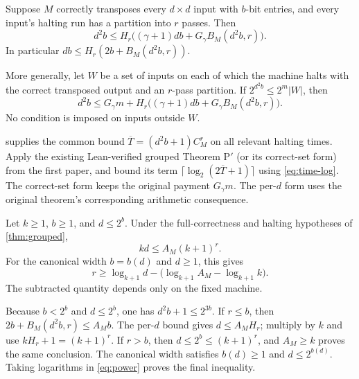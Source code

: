 \begin{theorem}\label{thm:grouped}
Suppose $M$ correctly transposes every $d\times d$ input with $b$-bit entries,
and every input's halting run has a partition into $r$ passes. Then
\begin{equation}\label{eq:grouped}
 d^2b\le H_r\bigl((\gamma+1)db+G_\gamma B_M(d^2b,r)\bigr).
\end{equation}
In particular $db\le H_r(2b+B_M(d^2b,r))$.

More generally, let $W$ be a set of inputs on each of which the machine
halts with the correct transposed output and an $r$-pass partition. If
$2^{d^2b}\le2^m|W|$, then
\begin{equation}\label{eq:grouped-on}
 d^2b\le G_\gamma m+
 H_r\bigl((\gamma+1)db+G_\gamma B_M(d^2b,r)\bigr).
\end{equation}
No condition is imposed on inputs outside $W$.
\end{theorem}
\begin{outline}
 supplies the common bound
$\overline T=(d^2b+1)C_M^r$ on all relevant halting times. Apply the existing
Lean-verified grouped Theorem P$'$ (or its correct-set form) from the first
paper, and bound its term $\lceil\log_2(2\overline T+1)\rceil$ using
\cref{eq:time-log}. The correct-set form keeps the original payment
$G_\gamma m$. The per-$d$ form uses the original theorem's corresponding
arithmetic consequence.
\end{outline}

\begin{theorem}\label{thm:passes}
Let $k\ge1$, $b\ge1$, and $d\le2^b$. Under the full-correctness and halting
hypotheses of \cref{thm:grouped},
\begin{equation}\label{eq:power}
 kd\le A_M(k+1)^r.
\end{equation}
For the canonical width $b=b(d)$ and $d\ge1$, this gives
\[
 r\ge\log_{k+1}d-
   \bigl(\log_{k+1}A_M-\log_{k+1}k\bigr).
\]
The subtracted quantity depends only on the fixed machine.
\end{theorem}
\begin{outline}
Because $b<2^b$ and $d\le2^b$, one has
$d^2b+1\le2^{3b}$. If $r\le b$, then
$2b+B_M(d^2b,r)\le A_M b$. The per-$d$ bound gives $d\le A_M H_r$;
multiply by $k$ and use $kH_r+1=(k+1)^r$.
If $r>b$, then $d\le2^b\le(k+1)^r$, and $A_M\ge k$ proves the same
conclusion. The canonical width satisfies $b(d)\ge1$ and $d\le2^{b(d)}$.
Taking logarithms in \cref{eq:power} proves the final inequality.
\end{outline}

